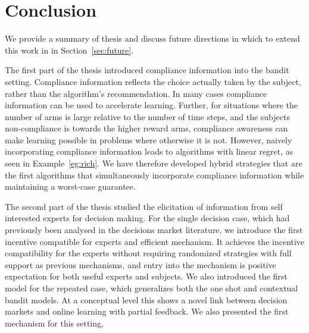 \chapter{Conclusion}
\label{cha:conc}

We provide a summary of thesis and discuss future directions in which to extend this work in in Section~\ref{sec:future}.


The first part of the thesis introduced compliance information into the bandit setting. 
Compliance information reflects the choice actually taken by the subject, rather than the algorithm's recommendation. 
In many cases compliance information can be used to accelerate learning.
Further, for situations where the number of arms is large relative to the number of time steps, and the subjects non-compliance is towards the higher reward arms, compliance awareness can make learning possible in problems where otherwise it is not. 
However, naively incorporating compliance information leads to algorithms with linear regret, as seen in Example~\ref{eg:rich}. 
We have therefore developed hybrid strategies that are the first algorithms that simultaneously incorporate compliance information while maintaining a worst-case guarantee. 

The second part of the thesis studied the elicitation of information from self interested experts for decision making.
For the single decision case, which had previously been analysed in the decisions market literature, we introduce the first incentive compatible for experts and efficient mechanism.
It achieves the incentive compatibility for the experts without requiring randomized strategies with full support as previous mechanisms, and entry into the mechanism is positive expectation for both useful experts and subjects.
We also introduced the first model for the repeated case, which generalizes both the one shot and contextual bandit models.
At a conceptual level this shows a novel link between decision markets and online learning with partial feedback.
We also presented the first mechanism for this setting, 




